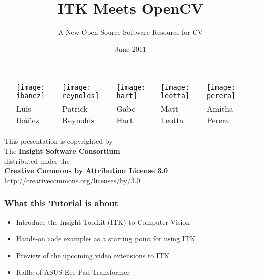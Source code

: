 \documentclass[18pt]{beamer}
\begin{document}
\title[ITK - OpenCV]{ITK Meets OpenCV}
\subtitle[ITK-OpenCV]{A New Open Source Software Resource for CV}
\date[June 2011]{June 2011}

\begin{frame}
\titlepage
\begin{tabular}{cp{}p{}p{}p{}p{}c}
&
\centering\texttt{[image: ibanez]} &
\centering\texttt{[image: reynolds]} &
\centering\texttt{[image: hart]} &
\centering\texttt{[image: leotta]} &
\centering\texttt{[image: perera]} & \\
&
\centering{}Luis Ib\'a\~nez &
\centering{}Patrick Reynolds &
\centering{}Gabe Hart &
\centering{}Matt Leotta &
\centering{}Amitha Perera & \\
\end{tabular}
\end{frame}


{
\begin{frame}[plain]
\center
\begin{center}
This presentation is copyrighted by\\
The \textbf{Insight Software Consortium}\\
\bigskip
distributed under the\\
\textbf{Creative Commons by Attribution License 3.0}\\
\url{http://creativecommons.org/licenses/by/3.0}\\
\end{center}
\end{frame}
}


\begin{frame}
  \tableofcontents
\end{frame}


\begin{frame}
\frametitle{What this Tutorial is about}
\begin{itemize}
\item Introduce the Insight Toolkit (ITK) to Computer Vision
\item Hands-on code examples as a starting point for using ITK
\item Preview of the upcoming video extensions to ITK
\item Raffle of ASUS Eee Pad Transformer
\end{itemize}
\end{frame}
\end{document}
